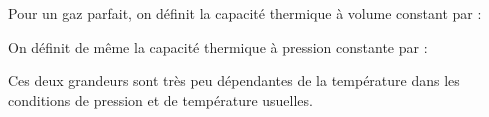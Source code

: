 \documentclass[a4paper]{article}
\begin{document}
\pagestyle{fancy}
\fancyhf{}
\setlength{\headheight}{15pt}

\begin{center}
	\large{}
\end{center}


Pour un gaz parfait, on définit la capacité thermique à volume constant par :\begin{center}\end{center}
On définit de même la capacité thermique à pression constante par :\begin{center}\end{center}
Ces deux grandeurs sont très peu dépendantes de la température dans les conditions de pression et de température usuelles.
\end{document}
